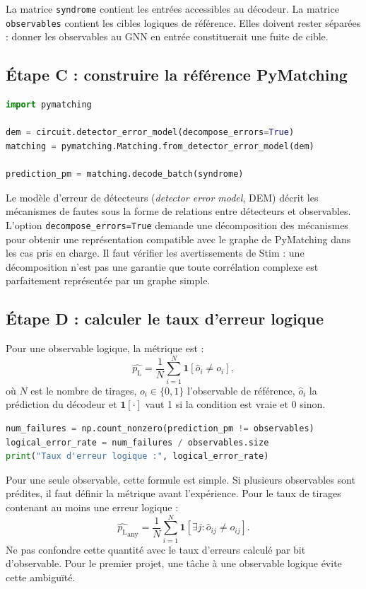 \documentclass[11pt,a4paper]{article}
\newcommand{\pL}{p_{\mathrm L}}
\begin{document}
La matrice \texttt{syndrome} contient les entrées accessibles au décodeur.
La matrice \texttt{observables} contient les cibles logiques de référence.
Elles doivent rester séparées : donner les observables au GNN en entrée
constituerait une fuite de cible.

\subsection{Étape C : construire la référence PyMatching}

\begin{lstlisting}[language=Python,caption={Décodeur MWPM de référence}]
import pymatching

dem = circuit.detector_error_model(decompose_errors=True)
matching = pymatching.Matching.from_detector_error_model(dem)

prediction_pm = matching.decode_batch(syndrome)
\end{lstlisting}

Le modèle d'erreur de détecteurs (\emph{detector error model}, DEM) décrit
les mécanismes de fautes sous la forme de relations entre détecteurs et
observables. L'option \texttt{decompose\_errors=True} demande une
décomposition des mécanismes pour obtenir une représentation compatible
avec le graphe de PyMatching dans les cas pris en charge. Il faut vérifier
les avertissements de Stim : une décomposition n'est pas une garantie que
toute corrélation complexe est parfaitement représentée par un graphe
simple.

\subsection{Étape D : calculer le taux d'erreur logique}

Pour une observable logique, la métrique est :
\[
 \widehat{\pL}=\frac{1}{N}\sum_{i=1}^{N}
 \mathbf{1}\!\left[\hat o_i\ne o_i\right],
\]
où $N$ est le nombre de tirages, $o_i\in\{0,1\}$ l'observable de référence,
$\hat o_i$ la prédiction du décodeur et $\mathbf 1[\cdot]$ vaut 1 si la
condition est vraie et 0 sinon.

\begin{lstlisting}[language=Python,caption={Calcul de l'erreur logique}]
num_failures = np.count_nonzero(prediction_pm != observables)
logical_error_rate = num_failures / observables.size
print("Taux d'erreur logique :", logical_error_rate)
\end{lstlisting}

Pour une seule observable, cette formule est simple. Si plusieurs observables
sont prédites, il faut définir la métrique avant l'expérience. Pour le taux
de tirages contenant au moins une erreur logique :
\[
 \widehat{\pL}_{\mathrm{any}}=
 \frac1N\sum_{i=1}^N
 \mathbf{1}\!\left[\exists j:\hat o_{ij}\ne o_{ij}\right].
\]
Ne pas confondre cette quantité avec le taux d'erreurs calculé par bit
d'observable. Pour le premier projet, une tâche à une observable logique
évite cette ambiguïté.
\end{document}
